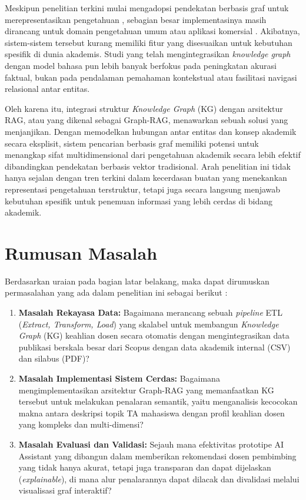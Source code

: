 Meskipun penelitian terkini mulai mengadopsi pendekatan berbasis graf untuk merepresentasikan pengetahuan \cite{edge2025localglobalgraphrag, guo2025lightragsimplefastretrievalaugmented, wu2024medicalgraphragsafe, qian2025memoragboostinglongcontext, peng2024graphretrievalaugmentedgenerationsurvey}, sebagian besar implementasinya masih dirancang untuk domain pengetahuan umum atau aplikasi komersial \cite{wu2024medicalgraphragsafe, edge2025localglobalgraphrag}. Akibatnya, sistem-sistem tersebut kurang memiliki fitur yang disesuaikan untuk kebutuhan spesifik di dunia akademis. Studi yang telah mengintegrasikan \textit{knowledge graph} dengan model bahasa pun lebih banyak berfokus pada peningkatan akurasi faktual, bukan pada pendalaman pemahaman kontekstual atau fasilitasi navigasi relasional antar entitas.

Oleh karena itu, integrasi struktur \textit{Knowledge Graph} (KG) dengan arsitektur RAG, atau yang dikenal sebagai Graph-RAG, menawarkan sebuah solusi yang menjanjikan. Dengan memodelkan hubungan antar entitas dan konsep akademik secara eksplisit, sistem pencarian berbasis graf memiliki potensi untuk menangkap sifat multidimensional dari pengetahuan akademik secara lebih efektif dibandingkan pendekatan berbasis vektor tradisional. Arah penelitian ini tidak hanya sejalan dengan tren terkini dalam kecerdasan buatan yang menekankan representasi pengetahuan terstruktur, tetapi juga secara langsung menjawab kebutuhan spesifik untuk penemuan informasi yang lebih cerdas di bidang akademik.

\section{Rumusan Masalah}
Berdasarkan uraian pada bagian latar belakang, maka dapat dirumuskan permasalahan yang ada dalam penelitian ini sebagai berikut :
\begin{enumerate}
	\item \textbf{Masalah Rekayasa Data:} Bagaimana merancang sebuah \textit{pipeline} ETL (\textit{Extract, Transform, Load}) yang skalabel untuk membangun \textit{Knowledge Graph} (KG) keahlian dosen secara otomatis dengan mengintegrasikan data publikasi berskala besar dari Scopus dengan data akademik internal (CSV) dan silabus (PDF)?
	
	\item \textbf{Masalah Implementasi Sistem Cerdas:} Bagaimana mengimplementasikan arsitektur Graph-RAG yang memanfaatkan KG tersebut untuk melakukan penalaran semantik, yaitu menganalisis kecocokan makna antara deskripsi topik TA mahasiswa dengan profil keahlian dosen yang kompleks dan multi-dimensi?
	
	\item \textbf{Masalah Evaluasi dan Validasi:} Sejauh mana efektivitas prototipe AI Assistant yang dibangun dalam memberikan rekomendasi dosen pembimbing yang tidak hanya akurat, tetapi juga transparan dan dapat dijelaskan (\textit{explainable}), di mana alur penalarannya dapat dilacak dan divalidasi melalui visualisasi graf interaktif?
\end{enumerate}

